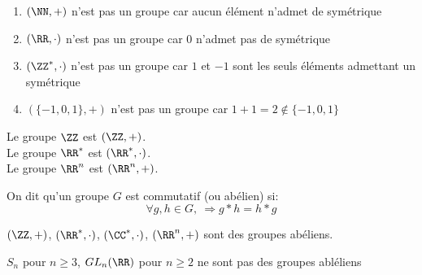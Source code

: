 \documentclass[../main.tex]{subfile}
\begin{document}
\begin{ex}
\begin{ctex}
\begin{enumerate}	
	\item $(\NN, +)$ n'est pas un groupe car aucun élément n'admet de symétrique
	\item $(\RR, \cdot)$ n'est pas un groupe car $0$ n'admet pas de symétrique
	\item $(\ZZ^*, \cdot)$ n'est pas un groupe car $1$ et $-1$ sont les seuls éléments admettant un symétrique
	\item $(\{-1, 0, 1\}, +)$ n'est pas un groupe car $1 + 1 = 2 \notin \{-1, 0, 1\}$
\end{enumerate}
\end{ctex}

\begin{rema}
	Le groupe $\ZZ$ est $(\ZZ, +)$.\\
	Le groupe $\RR^*$ est $(\RR^*, \cdot)$.\\
	Le groupe $\RR^n$ est $(\RR^n, +)$.\\
\end{rema}

\begin{defi}
	On dit qu'un groupe $G$ est commutatif (ou abélien) si:
	$$\forall g, h \in G, \ \Rightarrow g*h = h*g$$
\end{defi}

\begin{ex}
	$(\ZZ, +)$, $(\RR^*, \cdot)$, $(\CC^*, \cdot)$, $(\RR^n, +)$ sont des groupes abéliens.
\end{ex}

\begin{ctex}
	$S_n$ pour $n \geq 3$, $GL_n(\RR)$ pour $n \geq 2$ ne sont pas des groupes abléliens
\end{ctex}


\end{ex}
\end{document}
